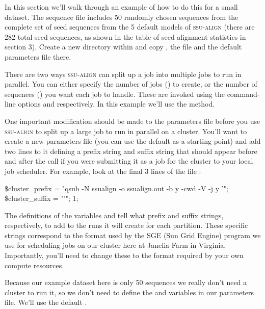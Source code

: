 In this section we'll walk through an example of how to do this for a
small dataset.  The sequence file  includes
50 randomly chosen sequences from the complete set of seed sequences
from the 5 default models of \textsc{ssu-align} (there are 282 total
seed sequences, as shown in the table of seed alignment statistics in
section 3). Create a new directory within  and copy
, the file
 and the default parameters file
 there.

There are two ways \textsc{ssu-align} can split up a job into multiple
jobs to run in parallel. You can either specify the number of jobs
() to create, or the number of sequences () you
want each job to handle. These are invoked using the command-line
options  and  respectively.  In this example
we'll use the  method.

One important modification should be made to the parameters file
before you use \textsc{ssu-align} to split up a large job to run in
parallel on a cluster. You'll want to create a new parameters file
(you can use the default  as a starting point) and
add two lines to it defining a prefix string and suffix string that
should appear before and after the  call if you were
submitting it as a job for the cluster to your local job
scheduler. For example, look at the final 3 lines of the file
:

\begin{sreoutput}
\$cluster\_prefix = "qsub -N ssualign -o ssualign.out -b y -cwd -V -j y '";
\$cluster\_suffix = "'";
1;
\end{sreoutput}

The definitions of the variables  and
 tell  what prefix and suffix
strings, respectively, to add to the  runs it will
create for each partition. These specific strings correspond to the
format used by the SGE (Sun Grid Engine)  program we use
for scheduling jobs on our cluster here at Janelia Farm in Virginia.
Importantly, you'll need to change these to the format required by
your own compute resources.

Because our example dataset here is only 50 sequences we really don't
need a cluster to run it, so we don't need to define the
 and  variables in our
parameters file. We'll use the default .

